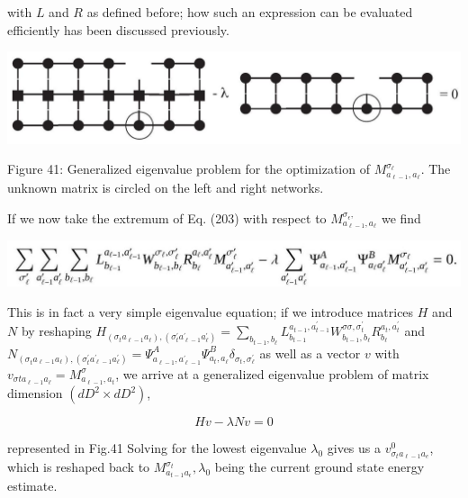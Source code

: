 \documentclass[12pt]{article}
\begin{document}
with $L$ and $R$ as defined before; how such an expression can be evaluated efficiently has been discussed previously.

\begin{center}
\includegraphics[max width=\textwidth]{2024_05_04_afc4ad226da9ccfe0ac8g-066(1)}
\end{center}

Figure 41: Generalized eigenvalue problem for the optimization of $M_{a_{\ell-1}, a_{\ell}}^{\sigma_{\ell}}$. The unknown matrix is circled on the left and right networks.

If we now take the extremum of Eq. (203) with respect to $M_{a_{\ell-1}, a_{\ell}}^{\sigma_{\epsilon},}$ we find

\begin{center}
\includegraphics[max width=\textwidth]{2024_05_04_afc4ad226da9ccfe0ac8g-066}
\end{center}

This is in fact a very simple eigenvalue equation; if we introduce matrices $H$ and $N$ by reshaping $H_{\left(\sigma_{t} a_{\ell-1} a_{\ell}\right),\left(\sigma_{t}^{\prime} a_{\ell-1}^{\prime} a_{\ell}^{\prime}\right)}=\sum_{b_{t-1}, b_{\ell}} L_{b_{t-1}}^{a_{t-1}, a_{t-1}^{\prime}} W_{b_{t-1}, b_{\ell}}^{\sigma \sigma, \sigma_{t}^{\prime}} R_{b_{\ell}}^{a_{t}, a_{t}^{\prime}}$ and $N_{\left(\sigma_{t} a_{\ell-1} a_{\ell}\right),\left(\sigma_{t}^{\prime} a_{\ell-1}^{\prime} a_{\ell}^{\prime}\right)}=\Psi_{a_{\ell-1}, a_{\ell-1}^{\prime}}^{A} \Psi_{a_{t}, a_{\ell}}^{B} \delta_{\sigma_{t}, \sigma_{\ell}^{\prime}}$ as well as a vector $v$ with $v_{\sigma t a_{\ell-1} a_{\ell}}=M_{a_{\ell-1}, a_{t}}^{\sigma}$, we arrive at a generalized eigenvalue problem of matrix dimension $\left(d D^{2} \times d D^{2}\right)$,


\begin{equation*}
H v-\lambda N v=0 \tag{210}
\end{equation*}


represented in Fig.41 Solving for the lowest eigenvalue $\lambda_{0}$ gives us a $v_{\sigma_{t} a_{\ell-1} a_{e}}^{0}$, which is reshaped back to $M_{a_{t-1} a_{\epsilon}}^{\sigma_{t}}, \lambda_{0}$ being the current ground state energy estimate.
\end{document}
